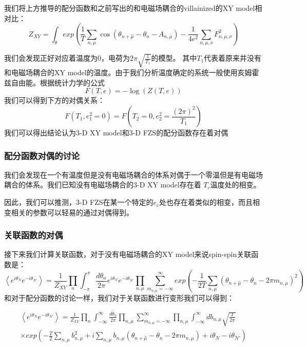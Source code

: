 \documentclass{article}
\begin{document}
我们将上方推导的配分函数和之前写出的和电磁场耦合的villainized的XY model相对比：
\begin{equation}
    Z_{XY} = \int_{\theta}  exp{ ( \frac{1}{T}  \sum_{n,\mu} \cos(\theta_{n+ \hat \mu} - \theta_n - A_{n,\mu})  - \frac{1}{4e^2} \sum_{n,\mu,\nu} F_{n,\mu,\nu}^2 )}
\end{equation}

我们会发现正好对应着温度为0，电荷为$2 \pi \sqrt{\frac{1}{T_1}}$的模型。
其中$T_1$代表着原来并没有和电磁场耦合的XY model的温度。由于我们分析温度确定的系统一般使用亥姆霍兹自由能。根据统计力学的公式
\begin{equation}
    F(T,e) = - \log(Z\left(T,e\right) )
\end{equation}
我们可以得到下方的对偶关系：
\begin{equation}
    F(T_1,e_1^2 = 0) = F\left( T_2 = 0, e_2^2 = \frac{\left(2 \pi\right)^2 }{T_1}\right)
\end{equation}
我们可以得出结论认为3-D XY model和3-D FZS的配分函数存在着对偶

\subsubsection{配分函数对偶的讨论}
我们会发现在一个有温度但是没有电磁场耦合的体系对偶于一个零温但是有电磁场耦合的体系。我们已知没有电磁场耦合的3-D XY model存在着
$T_c$温度处的相变。

因此，我们可以推测，3-D FZS在某一个特定的$e_c$处也存在着类似的相变，而且相变相关的参数可以轻易的通过对偶得到。

\subsubsection{关联函数的对偶}
接下来我们计算关联函数，对于没有电磁场耦合的XY model来说spin-spin关联函数是：
\begin{equation}
    \left\langle e^{i \theta_N}e^{- i \theta_{N'}}\right\rangle = \frac{1}{Z_{XY}}  \prod_n \int_{- \pi}^{\pi} \frac{d \theta_n}{2 \pi} e^{i \theta_N}e^{- i \theta_{N'}}   \prod_{n,\mu} \sum_{m_{n,\mu} = -\infty}^{\infty} exp ( - \frac{1}{2T} \sum_{n,\mu} (\theta_{n+ \hat \mu} - \theta_n - 2\pi m_{n,\mu})^2 )
\end{equation}
和对于配分函数的讨论一样，我们对于关联函数进行变形我们可以得到：

\begin{equation}
    \begin{split}
        \left\langle e^{i \theta_N}e^{- i \theta_{N'}}\right\rangle = \frac{1}{Z_{XY}} \prod_n \int_{- \infty}^{\infty} \frac{d \theta_n}{2 \pi} \prod_{n,\mu} \sum_{m_{n,\mu} = -\infty}^{\infty}  \prod_{n,\mu} \int_{- \infty}^{\infty} db_{n,\mu} \sqrt{\frac{T}{2 \pi}} \\
        \times exp\left( -\frac{T}{2} \sum_{n,\mu}b_{n,\mu}^2 + i \sum_{n,\mu} b_{n,\mu} \left( \theta_{n+\hat \mu} - \theta_n - 2 \pi m_{n,\mu} \right) + i\theta_N - i\theta_{N'} \right)   
    \end{split}
\end{equation}
\end{document}
